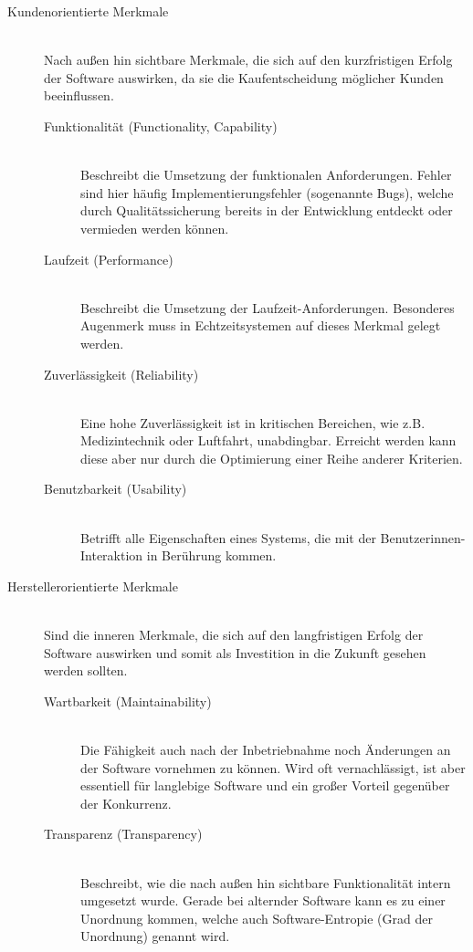 \begin{description}
  \item[Kundenorientierte Merkmale] \hfill \\ Nach außen hin sichtbare Merkmale, die sich auf den kurzfristigen Erfolg der Software auswirken, da sie die Kaufentscheidung möglicher Kunden beeinflussen.
  \begin{description}
    \item[Funktionalität (Functionality, Capability)] \hfill \\ Beschreibt die Umsetzung der funktionalen Anforderungen. Fehler sind hier häufig Implementierungsfehler (sogenannte Bugs), welche durch Qualitätssicherung bereits in der Entwicklung entdeckt oder vermieden werden können. 
    \item[Laufzeit (Performance)] \hfill \\ Beschreibt die Umsetzung der Laufzeit-Anforderungen. Besonderes Augenmerk muss in Echtzeitsystemen auf dieses Merkmal gelegt werden.
    \item[Zuverlässigkeit (Reliability)] \hfill \\ Eine hohe Zuverlässigkeit ist in kritischen Bereichen, wie z.B. Medizintechnik oder Luftfahrt, unabdingbar. Erreicht werden kann diese aber nur durch die Optimierung einer Reihe anderer Kriterien.
    \item[Benutzbarkeit (Usability)] \hfill \\ Betrifft alle Eigenschaften eines Systems, die mit der Benutzerinnen-Interaktion in Berührung kommen.
  \end{description}
  \item[Herstellerorientierte Merkmale] \hfill \\ Sind die inneren Merkmale, die sich auf den langfristigen Erfolg der Software auswirken und somit als Investition in die Zukunft gesehen werden sollten.
  \begin{description}
    \item[Wartbarkeit (Maintainability)] \hfill \\ Die Fähigkeit auch nach der Inbetriebnahme noch Änderungen an der Software vornehmen zu können. Wird oft vernachlässigt, ist aber essentiell für langlebige Software und ein großer Vorteil gegenüber der Konkurrenz.
    \item[Transparenz (Transparency)] \hfill \\ Beschreibt, wie die nach außen hin sichtbare Funktionalität intern umgesetzt wurde. Gerade bei alternder Software kann es zu einer Unordnung kommen, welche auch Software-Entropie (Grad der Unordnung) genannt wird.

\end{description}
\end{description}

